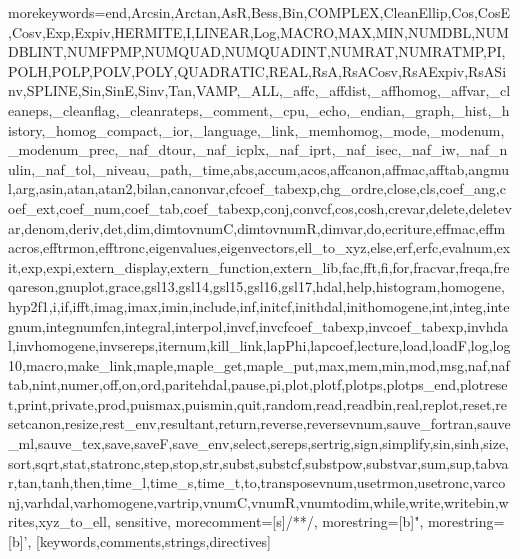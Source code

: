 %
{morekeywords={end,Arcsin,Arctan,AsR,Bess,Bin,COMPLEX,CleanEllip,Cos,CosE,Cosv,Exp,Expiv,HERMITE,I,LINEAR,Log,MACRO,MAX,MIN,NUMDBL,NUMDBLINT,NUMFPMP,NUMQUAD,NUMQUADINT,NUMRAT,NUMRATMP,PI,POLH,POLP,POLV,POLY,QUADRATIC,REAL,RsA,RsACosv,RsAExpiv,RsASinv,SPLINE,Sin,SinE,Sinv,Tan,VAMP,_ALL,_affc,_affdist,_affhomog,_affvar,_cleaneps,_cleanflag,_cleanrateps,_comment,_cpu,_echo,_endian,_graph,_hist,_history,_homog_compact,_ior,_language,_link,_memhomog,_mode,_modenum,_modenum_prec,_naf_dtour,_naf_icplx,_naf_iprt,_naf_isec,_naf_iw,_naf_nulin,_naf_tol,_niveau,_path,_time,abs,accum,acos,affcanon,affmac,afftab,angmul,arg,asin,atan,atan2,bilan,canonvar,cfcoef_tabexp,chg_ordre,close,cls,coef_ang,coef_ext,coef_num,coef_tab,coef_tabexp,conj,convcf,cos,cosh,crevar,delete,deletevar,denom,deriv,det,dim,dimtovnumC,dimtovnumR,dimvar,do,ecriture,effmac,effmacros,efftrmon,efftronc,eigenvalues,eigenvectors,ell_to_xyz,else,erf,erfc,evalnum,exit,exp,expi,extern_display,extern_function,extern_lib,fac,fft,fi,for,fracvar,freqa,freqareson,gnuplot,grace,gsl13,gsl14,gsl15,gsl16,gsl17,hdal,help,histogram,homogene,hyp2f1,i,if,ifft,imag,imax,imin,include,inf,initcf,inithdal,inithomogene,int,integ,integnum,integnumfcn,integral,interpol,invcf,invcfcoef_tabexp,invcoef_tabexp,invhdal,invhomogene,invsereps,iternum,kill_link,lapPhi,lapcoef,lecture,load,loadF,log,log10,macro,make_link,maple,maple_get,maple_put,max,mem,min,mod,msg,naf,naftab,nint,numer,off,on,ord,paritehdal,pause,pi,plot,plotf,plotps,plotps_end,plotreset,print,private,prod,puismax,puismin,quit,random,read,readbin,real,replot,reset,resetcanon,resize,rest_env,resultant,return,reverse,reversevnum,sauve_fortran,sauve_ml,sauve_tex,save,saveF,save_env,select,sereps,sertrig,sign,simplify,sin,sinh,size,sort,sqrt,stat,statronc,step,stop,str,subst,substcf,substpow,substvar,sum,sup,tabvar,tan,tanh,then,time_l,time_s,time_t,to,transposevnum,usetrmon,usetronc,varconj,varhdal,varhomogene,vartrip,vnumC,vnumR,vnumtodim,while,write,writebin,writes,xyz_to_ell},%
    sensitive,%
    morecomment=[s]{/*}{*/},%
    morestring=[b]",%
    morestring=[b]',%
   }[keywords,comments,strings,directives]%
\lstset{language=TRIP}
\lstset{basicstyle=\tiny,%
        stringstyle=\bfseries,%
        title=\lstname,%
        frame=LTRB
        }

